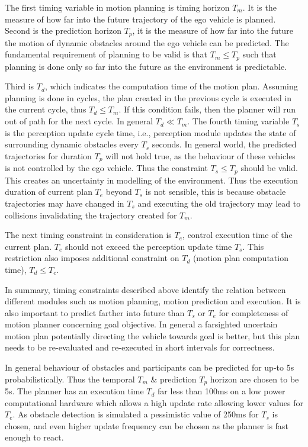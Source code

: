 The first timing variable in motion planning is timing horizon $ T_m $. It is the measure of how far into the future trajectory of the ego vehicle is planned. Second is the prediction horizon $ T_p $, it is the measure of how far into the future the motion of dynamic obstacles around the ego vehicle can be predicted. The fundamental requirement of planning to be valid is that $ T_m  \le  T_p $ such that planning is done only so far into the future as the environment is predictable. 

Third is $ T_d $, which indicates the computation time of the motion plan. Assuming planning is done in cycles, the plan created in the previous cycle is executed in the current cycle, thus $ T_d  \le  T_m $. If this condition fails, then the planner will run out of path for the next cycle. In general $ T_d \ll T_m $. The fourth timing variable $ T_s $ is the perception update cycle time, i.e., perception module updates the state of surrounding dynamic obstacles every $ T_s $ seconds. In general world, the predicted trajectories for duration $ T_p $ will not hold true, as the behaviour of these vehicles is not controlled by the ego vehicle. Thus the constraint $ T_s  \le T_p $ should be valid. This creates an uncertainty in modelling of the environment. Thus the execution duration of current plan $ T_e $ beyond $ T_s $ is not sensible, this is because obstacle trajectories may have changed in $ T_s $ and executing the old trajectory may lead to collisions invalidating the trajectory created for $ T_m $. 

The next timing constraint in consideration is $ T_e $, control execution time of the current plan. $ T_e $ should not exceed the perception update time $ T_s $. This restriction also imposes additional constraint on $ T_d $ (motion plan computation time), $ T_d \le T_e $. 

In summary, timing constraints described above identify the relation between different modules such as motion planning, motion prediction and execution. It is also important to predict farther into future than $T_s$ or $T_e$ for completeness of motion planner concerning goal objective. In general a farsighted uncertain motion plan potentially directing the vehicle towards goal is better, but this plan needs to be re-evaluated and re-executed in short intervals for correctness. 

In general behaviour of obstacles and participants can be predicted for up-to 5s probabilistically. Thus the temporal $ T_m $ \& prediction $ T_p $ horizon are chosen to be 5s. The planner has an execution time $ T_d $ far less than 100ms on a low power computational hardware which allows a high update rate allowing lower values for $ T_e $. As obstacle detection is simulated a pessimistic value of 250ms for $ T_s $ is chosen, and even higher update frequency can be chosen as the planner is fast enough to react. 

